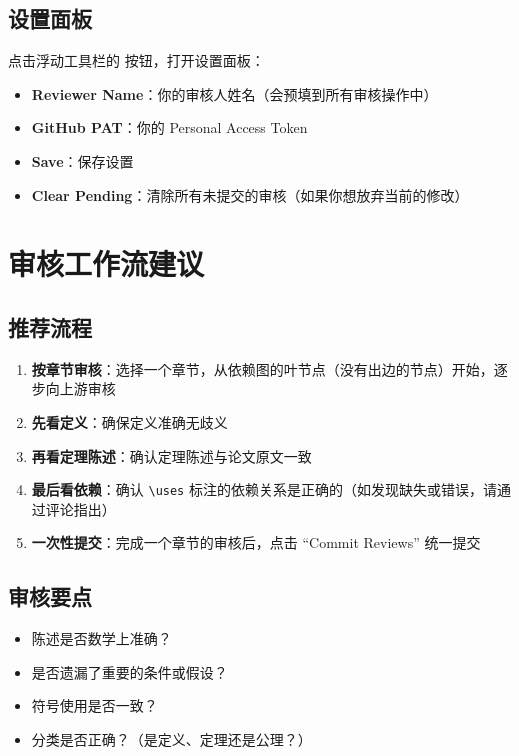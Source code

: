 \documentclass[11pt,a4paper]{article}
\newcommand{\gearsymbol}{\raisebox{-0.5pt}{\scriptsize$\diamond$}}
\begin{document}
\subsection{设置面板}

点击浮动工具栏的 \gearsymbol{} 按钮，打开设置面板：

\begin{itemize}[nosep]
  \item \textbf{Reviewer Name}：你的审核人姓名（会预填到所有审核操作中）
  \item \textbf{GitHub PAT}：你的 Personal Access Token
  \item \textbf{Save}：保存设置
  \item \textbf{Clear Pending}：清除所有未提交的审核（如果你想放弃当前的修改）
\end{itemize}

\section{审核工作流建议}

\subsection{推荐流程}

\begin{enumerate}[nosep]
  \item \textbf{按章节审核}：选择一个章节，从依赖图的叶节点（没有出边的节点）开始，逐步向上游审核
  \item \textbf{先看定义}：确保定义准确无歧义
  \item \textbf{再看定理陈述}：确认定理陈述与论文原文一致
  \item \textbf{最后看依赖}：确认 \verb|\uses| 标注的依赖关系是正确的（如发现缺失或错误，请通过评论指出）
  \item \textbf{一次性提交}：完成一个章节的审核后，点击 ``Commit Reviews'' 统一提交
\end{enumerate}

\subsection{审核要点}

\begin{tipbox}[审核 NL（自然语言）时]
\begin{itemize}[nosep]
  \item 陈述是否数学上准确？
  \item 是否遗漏了重要的条件或假设？
  \item 符号使用是否一致？
  \item 分类是否正确？（是定义、定理还是公理？）
\end{itemize}
\end{tipbox}
\end{document}
